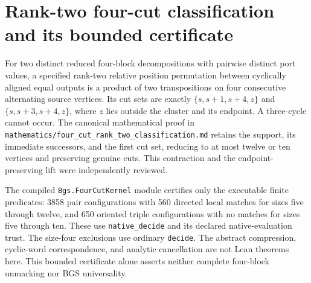 \section{Rank-two four-cut classification and its bounded certificate}
For two distinct reduced four-block decompositions with pairwise distinct
port values, a specified rank-two relative position permutation between
cyclically aligned equal outputs is a product of two transpositions on four
consecutive alternating source vertices. Its cut sets are exactly
$\{s,s+1,s+4,z\}$ and $\{s,s+3,s+4,z\}$, where $z$ lies outside the cluster
and its endpoint. A three-cycle cannot occur. The canonical mathematical
proof in \texttt{mathematics/four\_cut\_rank\_two\_classification.md}
retains the support, its immediate successors, and the first cut set,
reducing to at most twelve or ten vertices and preserving genuine cuts.
This contraction and the endpoint-preserving lift were independently reviewed.

The compiled \texttt{Bgs.FourCutKernel} module certifies only the executable
finite predicates: 3858 pair configurations with 560 directed local matches
for sizes five through twelve, and 650 oriented triple configurations with
no matches for sizes five through ten. These use \texttt{native\_decide}
and its declared native-evaluation trust. The size-four exclusions use
ordinary \texttt{decide}. The abstract compression, cyclic-word correspondence,
and analytic cancellation are not Lean theorems here. This bounded certificate
alone asserts neither complete four-block unmarking nor BGS universality.
